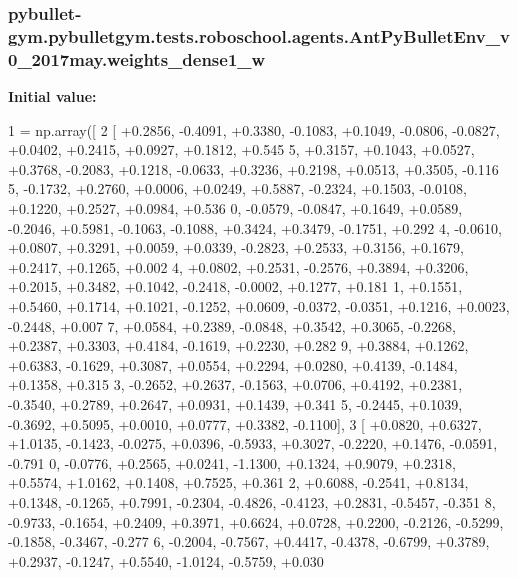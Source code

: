\subsubsection[{\texorpdfstring{weights\+\_\+dense1\+\_\+w}{weights_dense1_w}}]{\setlength{\rightskip}{0pt plus 5cm}pybullet-\/gym.\+pybulletgym.\+tests.\+roboschool.\+agents.\+Ant\+Py\+Bullet\+Env\+\_\+v0\+\_\+2017may.\+weights\+\_\+dense1\+\_\+w}\hypertarget{namespacepybullet-gym_1_1pybulletgym_1_1tests_1_1roboschool_1_1agents_1_1_ant_py_bullet_env__v0__2017may_a7d000d288bc49b1e458fbae3098f7610}{}\label{namespacepybullet-gym_1_1pybulletgym_1_1tests_1_1roboschool_1_1agents_1_1_ant_py_bullet_env__v0__2017may_a7d000d288bc49b1e458fbae3098f7610}
{\bfseries Initial value\+:}
\begin{DoxyCode}
1 = np.array([
2 [ +0.2856, -0.4091, +0.3380, -0.1083, +0.1049, -0.0806, -0.0827, +0.0402, +0.2415, +0.0927, +0.1812, +0.545
      5, +0.3157, +0.1043, +0.0527, +0.3768, -0.2083, +0.1218, -0.0633, +0.3236, +0.2198, +0.0513, +0.3505, -0.116
      5, -0.1732, +0.2760, +0.0006, +0.0249, +0.5887, -0.2324, +0.1503, -0.0108, +0.1220, +0.2527, +0.0984, +0.536
      0, -0.0579, -0.0847, +0.1649, +0.0589, -0.2046, +0.5981, -0.1063, -0.1088, +0.3424, +0.3479, -0.1751, +0.292
      4, -0.0610, +0.0807, +0.3291, +0.0059, +0.0339, -0.2823, +0.2533, +0.3156, +0.1679, +0.2417, +0.1265, +0.002
      4, +0.0802, +0.2531, -0.2576, +0.3894, +0.3206, +0.2015, +0.3482, +0.1042, -0.2418, -0.0002, +0.1277, +0.181
      1, +0.1551, +0.5460, +0.1714, +0.1021, -0.1252, +0.0609, -0.0372, -0.0351, +0.1216, +0.0023, -0.2448, +0.007
      7, +0.0584, +0.2389, -0.0848, +0.3542, +0.3065, -0.2268, +0.2387, +0.3303, +0.4184, -0.1619, +0.2230, +0.282
      9, +0.3884, +0.1262, +0.6383, -0.1629, +0.3087, +0.0554, +0.2294, +0.0280, +0.4139, -0.1484, +0.1358, +0.315
      3, -0.2652, +0.2637, -0.1563, +0.0706, +0.4192, +0.2381, -0.3540, +0.2789, +0.2647, +0.0931, +0.1439, +0.341
      5, -0.2445, +0.1039, -0.3692, +0.5095, +0.0010, +0.0777, +0.3382, -0.1100],
3 [ +0.0820, +0.6327, +1.0135, -0.1423, -0.0275, +0.0396, -0.5933, +0.3027, -0.2220, +0.1476, -0.0591, -0.791
      0, -0.0776, +0.2565, +0.0241, -1.1300, +0.1324, +0.9079, +0.2318, +0.5574, +1.0162, +0.1408, +0.7525, +0.361
      2, +0.6088, -0.2541, +0.8134, +0.1348, -0.1265, +0.7991, -0.2304, -0.4826, -0.4123, +0.2831, -0.5457, -0.351
      8, -0.9733, -0.1654, +0.2409, +0.3971, +0.6624, +0.0728, +0.2200, -0.2126, -0.5299, -0.1858, -0.3467, -0.277
      6, -0.2004, -0.7567, +0.4417, -0.4378, -0.6799, +0.3789, +0.2937, -0.1247, +0.5540, -1.0124, -0.5759, +0.030

\end{DoxyCode}
